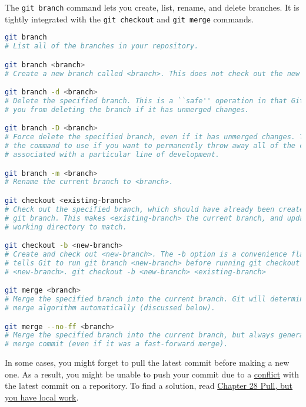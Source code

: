 The \texttt{git branch} command lets you create, list, rename, and delete branches.
It is tightly integrated with the \texttt{git checkout} and \texttt{git merge} commands.
\begin{lstlisting}[language=bash]
git branch
# List all of the branches in your repository.

git branch <branch>
# Create a new branch called <branch>. This does not check out the new branch.

git branch -d <branch>
# Delete the specified branch. This is a ``safe'' operation in that Git prevents
# you from deleting the branch if it has unmerged changes.

git branch -D <branch>
# Force delete the specified branch, even if it has unmerged changes. This is
# the command to use if you want to permanently throw away all of the commits
# associated with a particular line of development.

git branch -m <branch>
# Rename the current branch to <branch>.

git checkout <existing-branch>
# Check out the specified branch, which should have already been created with
# git branch. This makes <existing-branch> the current branch, and updates the
# working directory to match.

git checkout -b <new-branch>
# Create and check out <new-branch>. The -b option is a convenience flag that
# tells Git to run git branch <new-branch> before running git checkout
# <new-branch>. git checkout -b <new-branch> <existing-branch>

git merge <branch>
# Merge the specified branch into the current branch. Git will determine the
# merge algorithm automatically (discussed below).

git merge --no-ff <branch>
# Merge the specified branch into the current branch, but always generate a
# merge commit (even if it was a fast-forward merge).
\end{lstlisting}

In some cases, you might forget to pull the latest commit before making a new one.
As a result, you might be unable to push your commit due to a \href{https://happygitwithr.com/push-rejected.html}{conflict} with the latest commit on a repository.
To find a solution, read \href{https://happygitwithr.com/pull-tricky.html}{Chapter 28 Pull, but you have local work}.
